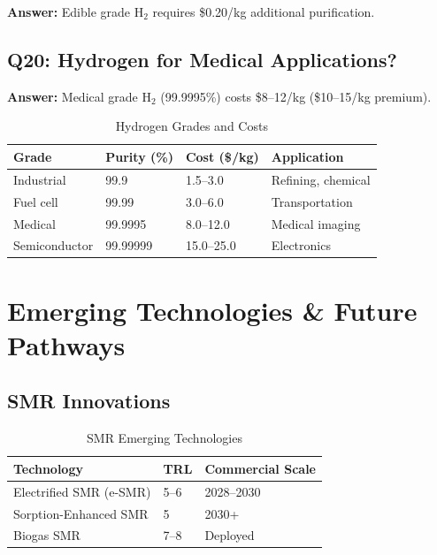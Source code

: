 \documentclass[12pt,twoside,openany]{book}
\newcommand{\tighttabular}{\small\setlength{\tabcolsep}{3.5pt}}
\begin{document}
\textbf{Answer:} Edible grade H$_2$ requires \$0.20/kg additional purification.

\section{Q20: Hydrogen for Medical Applications?}

\textbf{Answer:} Medical grade H$_2$ (99.9995\%) costs \$8--12/kg (\$10--15/kg premium).

\begin{table}[htbp]
    \centering
    \tighttabular
    \caption{Hydrogen Grades and Costs}
    \label{tab:h2_grades}
    \begin{tabular}{L{3cm} C{2.1cm} C{2.1cm} L{3cm}}
    \hline
    \textbf{Grade} & \textbf{Purity (\%)} & \textbf{Cost (\$/kg)} & \textbf{Application} \\
    \hline
    Industrial     & 99.9 & 1.5--3.0 & Refining, chemical \\
    Fuel cell      & 99.99 & 3.0--6.0 & Transportation \\
    Medical        & 99.9995 & 8.0--12.0 & Medical imaging \\
    Semiconductor  & 99.99999 & 15.0--25.0 & Electronics \\
    \hline
    \end{tabular}
\end{table}


\chapter{Emerging Technologies \& Future Pathways}

\section{SMR Innovations}

\begin{table}[htbp]
    \centering
    \caption{SMR Emerging Technologies}
    \label{tab:smr_emerging}
    \begin{tabular}{L{5cm} C{2cm} C{2.5cm}}
    \hline
    \textbf{Technology} & \textbf{TRL} & \textbf{Commercial Scale} \\
    \hline
    Electrified SMR (e-SMR) & 5--6 & 2028--2030 \\
    Sorption-Enhanced SMR   & 5    & 2030+      \\
    Biogas SMR              & 7--8 & Deployed   \\
    \hline
    \end{tabular}
\end{table}
\end{document}
